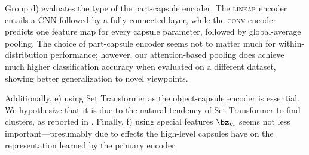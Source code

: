 Group d) evaluates the type of the part-capsule encoder.
The \textsc{linear} encoder entails a \gls{CNN} followed by a fully-connected layer, while the \textsc{conv} encoder predicts one feature map for every capsule parameter, followed by global-average pooling. 
The choice of part-capsule encoder seems not to matter much for within-distribution performance; however, our attention-based pooling does achieve much higher classification accuracy when evaluated on a different dataset, showing better generalization to novel viewpoints.

Additionally, e) using Set Transformer as the object-capsule encoder is essential.
We hypothesize that it is due to the natural tendency of Set Transformer to find clusters, as reported in \cite{Lee2019set}.
Finally, f) using special features $\bz_m$ seems not less important---presumably due to effects the high-level capsules have on the representation learned by the primary encoder.